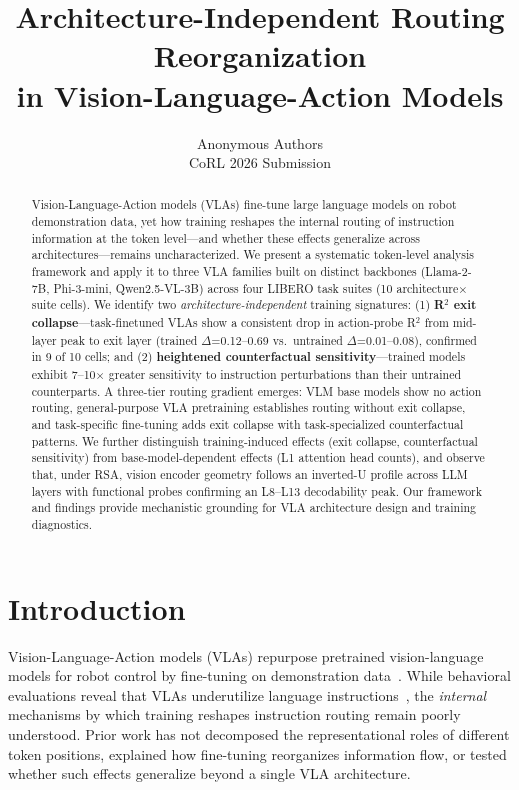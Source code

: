 \documentclass[letterpaper]{article}
\title{Architecture-Independent Routing Reorganization\\in Vision-Language-Action Models}
\author{
  Anonymous Authors\\
  CoRL 2026 Submission
}
\date{}
\begin{document}
\maketitle

\begin{abstract}
Vision-Language-Action models (VLAs) fine-tune large language models on robot demonstration data, yet how training reshapes the internal routing of instruction information at the token level---and whether these effects generalize across architectures---remains uncharacterized.
We present a systematic token-level analysis framework and apply it to three VLA families built on distinct backbones (Llama-2-7B, Phi-3-mini, Qwen2.5-VL-3B) across four LIBERO task suites (10 architecture$\times$suite cells).
We identify two \emph{architecture-independent} training signatures: (1) \textbf{R$^2$ exit collapse}---task-finetuned VLAs show a consistent drop in action-probe R$^2$ from mid-layer peak to exit layer (trained $\Delta$=0.12--0.69 vs.\ untrained $\Delta$=0.01--0.08), confirmed in 9 of 10 cells; and (2) \textbf{heightened counterfactual sensitivity}---trained models exhibit 7--10$\times$ greater sensitivity to instruction perturbations than their untrained counterparts.
A three-tier routing gradient emerges: VLM base models show no action routing, general-purpose VLA pretraining establishes routing without exit collapse, and task-specific fine-tuning adds exit collapse with task-specialized counterfactual patterns.
We further distinguish training-induced effects (exit collapse, counterfactual sensitivity) from base-model-dependent effects (L1 attention head counts), and observe that, under RSA, vision encoder geometry follows an inverted-U profile across LLM layers with functional probes confirming an L8--L13 decodability peak.
Our framework and findings provide mechanistic grounding for VLA architecture design and training diagnostics.
\end{abstract}

\section{Introduction}
\label{sec:intro}

Vision-Language-Action models (VLAs) repurpose pretrained vision-language models for robot control by fine-tuning on demonstration data~\cite{brohan2023rt2, kim2024openvla}.
While behavioral evaluations reveal that VLAs underutilize language instructions~\cite{grant2026visual, haon2025lost}, the \emph{internal} mechanisms by which training reshapes instruction routing remain poorly understood.
Prior work has not decomposed the representational roles of different token positions, explained how fine-tuning reorganizes information flow, or tested whether such effects generalize beyond a single VLA architecture.
\end{document}
